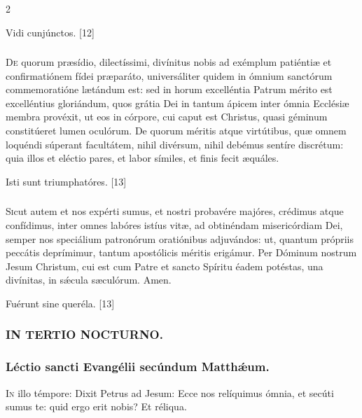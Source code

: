 \documentclass[9pt,twoside]{extarticle}
\begin{document}
\begin{multicols}{2}
\begin{tightlist}{}
\item {} Vidi cunjúnctos. [12]
\end{tightlist}

\subsubsection*{\center {}}
\lettrine{D}e quorum præsídio, dilectíssimi, divínitus nobis ad exémplum patiéntiæ et confirmatiónem fídei præparáto, universáliter quidem in ómnium sanctórum commemoratióne lætándum est: sed in horum excelléntia Patrum mérito est excelléntius gloriándum, quos grátia Dei in tantum ápicem inter ómnia Ecclésiæ membra provéxit, ut eos in córpore, cui caput est Christus, quasi géminum constitúeret lumen oculórum. De quorum méritis atque virtútibus, quæ omnem loquéndi súperant facultátem, nihil divérsum, nihil debémus sentíre discrétum: quia illos et eléctio pares, et labor símiles, et finis fecit æquáles.

\begin{tightlist}{}
\item {} Isti sunt triumphatóres. [13]
\end{tightlist}

\subsubsection*{\center {}}
\lettrine{S}icut autem et nos expérti sumus, et nostri probavére majóres, crédimus atque confídimus, inter omnes labóres istíus vitæ, ad obtinéndam misericórdiam Dei, semper nos speciálium patronórum oratiónibus adjuvándos: ut, quantum própriis peccátis deprímimur, tantum apostólicis méritis erigámur. Per Dóminum nostrum Jesum Christum, cui est cum Patre et sancto Spíritu éadem potéstas, una divínitas, in sǽcula sæculórum. Amen.

\begin{tightlist}{}
\item {} Fuérunt sine queréla. [13]
\end{tightlist}

\subsubsection*{\center \textsc{IN TERTIO NOCTURNO.}}
\subsubsection*{\center Léctio sancti Evangélii secúndum Matthǽum.}
\begin{center}\end{center}
\lettrine{I}n illo témpore: Dixit Petrus ad Jesum: Ecce nos relíquimus ómnia, et secúti sumus te: quid ergo erit nobis? Et réliqua.


\end{multicols}
\end{document}
